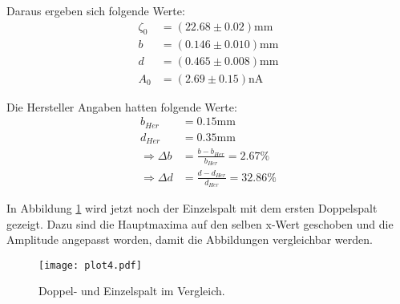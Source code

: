 Daraus ergeben sich folgende Werte:
\begin{align*}
  \zeta_0 &= (22.68 \pm 0.02) \text{mm} \\
  b &= (0.146 \pm 0.010) \text{mm} \\
  d &= (0.465 \pm 0.008) \text{mm} \\
  A_0 &= (2.69 \pm 0.15) \text{nA}
\end{align*}

Die Hersteller Angaben hatten folgende Werte:
\begin{align*}
  b_{Her} &= 0.15 \text{mm} \\
  d_{Her} &= 0.35 \text{mm} \\
  \Rightarrow \Delta b &= \frac{b - b_{Her}}{b_{Her}} = 2.67\% \\
  \Rightarrow \Delta d &= \frac{d - d_{Her}}{d_{Her}} = 32.86\%
\end{align*}

In Abbildung \ref{fig:plot4} wird jetzt noch der Einzelspalt mit dem ersten Doppelspalt gezeigt.
Dazu sind die Hauptmaxima auf den selben x-Wert geschoben und die Amplitude angepasst worden, damit die Abbildungen vergleichbar werden.

\begin{figure}
  \centering
  \texttt{[image: plot4.pdf]}
  \caption{Doppel- und Einzelspalt im Vergleich.}
  \label{fig:plot4}
\end{figure}
\FloatBarrier
